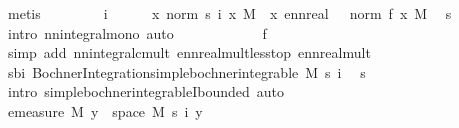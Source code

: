 \begin{isabellebody}
\ metis\isanewline
\ \ \isacommand{{\isacharbraceleft}{\kern0pt}}\isamarkupfalse%
\isanewline
\ \ \ \ \isamarkupfalse%
\ i\isanewline
\ \ \ \ \isamarkupfalse%
\ {\isachardoublequoteopen}{\isacharparenleft}{\kern0pt}{\isasymintegral}\isactrlsup {\isacharplus}{\kern0pt}x{\isachardot}{\kern0pt}\ norm\ {\isacharparenleft}{\kern0pt}s\ i\ x{\isacharparenright}{\kern0pt}\ {\isasympartial}M{\isacharparenright}{\kern0pt}\ {\isasymle}\ {\isacharparenleft}{\kern0pt}{\isasymintegral}\isactrlsup {\isacharplus}{\kern0pt}x{\isachardot}{\kern0pt}\ ennreal\ {\isacharparenleft}{\kern0pt}{}\ {\isacharasterisk}{\kern0pt}\ norm\ {\isacharparenleft}{\kern0pt}f\ x{\isacharparenright}{\kern0pt}{\isacharparenright}{\kern0pt}\ {\isasympartial}M{\isacharparenright}{\kern0pt}{\isachardoublequoteclose}\ \isamarkupfalse%
\ s\ \isamarkupfalse%
\ {\isacharparenleft}{\kern0pt}intro\ nn{\isacharunderscore}{\kern0pt}integral{\isacharunderscore}{\kern0pt}mono{\isacharcomma}{\kern0pt}\ auto{\isacharparenright}{\kern0pt}\isanewline
\ \ \ \ \isamarkupfalse%
\ \isamarkupfalse%
\ {\isachardoublequoteopen}{\isasymdots}\ {\isacharless}{\kern0pt}\ {\isasyminfinity}{\isachardoublequoteclose}\ \isamarkupfalse%
\ f\ \isamarkupfalse%
\ {\isacharparenleft}{\kern0pt}simp\ add{\isacharcolon}{\kern0pt}\ nn{\isacharunderscore}{\kern0pt}integral{\isacharunderscore}{\kern0pt}cmult\ ennreal{\isacharunderscore}{\kern0pt}mult{\isacharunderscore}{\kern0pt}less{\isacharunderscore}{\kern0pt}top\ ennreal{\isacharunderscore}{\kern0pt}mult{\isacharparenright}{\kern0pt}\isanewline
\ \ \ \ \isamarkupfalse%
\ \isamarkupfalse%
\ sbi{\isacharcolon}{\kern0pt}\ {\isachardoublequoteopen}Bochner{\isacharunderscore}{\kern0pt}Integration{\isachardot}{\kern0pt}simple{\isacharunderscore}{\kern0pt}bochner{\isacharunderscore}{\kern0pt}integrable\ M\ {\isacharparenleft}{\kern0pt}s\ i{\isacharparenright}{\kern0pt}{\isachardoublequoteclose}\ \isamarkupfalse%
\ s\ \isamarkupfalse%
\ {\isacharparenleft}{\kern0pt}intro\ simple{\isacharunderscore}{\kern0pt}bochner{\isacharunderscore}{\kern0pt}integrableI{\isacharunderscore}{\kern0pt}bounded{\isacharparenright}{\kern0pt}\ auto\isanewline
\ \ \ \ \isamarkupfalse%
\ {\isachardoublequoteopen}emeasure\ M\ {\isacharbraceleft}{\kern0pt}y\ {\isasymin}\ space\ M{\isachardot}{\kern0pt}\ s\ i\ y\ {\isasymnoteq}\ {}{\isacharbraceright}{\kern0pt}\ {\isasymnoteq}\ {\isasyminfinity}{\isachardoublequoteclose}\ \isamarkupfalse%

\end{isabellebody}
